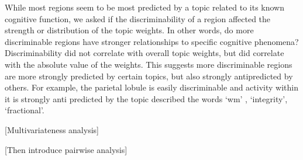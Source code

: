 While most regions seem to be most predicted by a topic related to its known cognitive function, we asked if the discriminability of a region affected the strength or distribution of the topic weights. In other words, do more discriminable regions have stronger relationships to specific cognitive phenomena? Discriminability did not correlate with overall topic weights, but did correlate with the absolute value of the weights. This suggests more discriminable regions are more strongly predicted by certain topics, but also strongly antipredicted by others. For example, the parietal lobule is easily discriminable and activity within it is strongly anti predicted by the topic described the words ‘wm’ , ‘integrity’, ‘fractional’.

[Multivariateness analysis]

[Then introduce pairwise analysis] 

